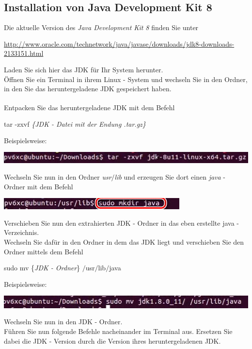\documentclass[a4paper, 12pt]{scrreprt}
\begin{document}
\subsection{Installation von Java Development Kit 8}
Die aktuelle Version des {\it Java Development Kit 8} finden Sie unter
\begin{center}
	\url{http://www.oracle.com/technetwork/java/javase/downloads/jdk8-downloads-2133151.html}
\end{center}
Laden Sie sich hier das JDK für Ihr System herunter.\\
Öffnen Sie ein Terminal in ihrem Linux - System und wechseln Sie in den Ordner, in den Sie das heruntergeladene JDK gespeichert haben.\\
\ \\
Entpacken Sie das heruntergeladene JDK mit dem Befehl
\begin{center}
	tar -zxvf {\it \{JDK - Datei mit der Endung .tar.gz\} }
\end{center}
Beispielsweise:
\begin{center}
\includegraphics[width=0.85\linewidth]{Grafiken/Linux_Java_pfad}
\end{center}
Wechseln Sie nun in den Ordner {\it usr$/$lib} und erzeugen Sie dort einen {\it java} - Ordner mit dem Befehl
\begin{center}
\includegraphics[width=0.6\linewidth]{Grafiken/Linux_create_java}
\end{center}
Verschieben Sie nun den extrahierten JDK - Ordner in das eben erstellte java - Verzeichnis.\\
Wechseln Sie dafür in den Ordner in dem das JDK liegt und verschieben Sie den Ordner mittels dem Befehl
\begin{center}
	sudo mv \{{\it JDK - Ordner}\} $/$usr$/$lib$/$java
\end{center}
Beispielsweise: 
\begin{center}
\includegraphics[width=0.75\linewidth]{Grafiken/Linux_Move_befehl}
\end{center}
Wechseln Sie nun in den JDK - Ordner. \\
Führen Sie nun folgende Befehle nacheinander im Terminal aus. Ersetzen Sie dabei die JDK - Version durch die Version ihres heruntergeladenen JDK.
\end{document}
